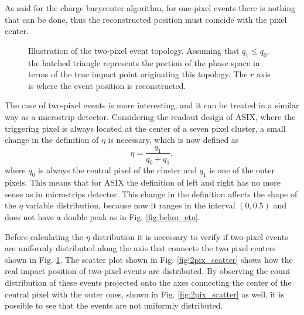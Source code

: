 As said for the charge barycenter algorithm, for one-pixel events there is nothing that can be done, thus the reconstructed position must coincide with the pixel center.

\begin{figure}[!t]
    \centering
    \caption{Illustration of the two-pixel event topology. Assuming that  $q_1 \leq q_0$, 
    the hatched triangle represents the portion of the phase space in terms of the 
    true impact point originating this topology. The $r$ axis is where the event position is reconstructed.}
    \label{fig:two_pixel_event}
\end{figure}

The case of two-pixel events is more interesting, and it can be treated in a similar way as a microstrip detector. Considering the readout design of ASIX, where the triggering pixel is always located at the center of a seven pixel cluster, a small change in the definition of $\eta$ is necessary, which is now defined as
\begin{equation}
\eta = \frac{q_1}{q_0 + q_1},
\label{eq:eta_2pix}
\end{equation}
where $q_0$ is always the central pixel of the cluster and $q_1$ is one of the outer pixels. This means that for ASIX the definition of left and right has no more sense as in microstrips detector. This change in the definition affects the shape of the $\eta$ variable distribution, because now it ranges in the interval $(0, 0.5)$ and does not have a double peak as in Fig. \ref{fig:belau_eta}. 

Before calculating the $\eta$ distribution it is necessary to verify if two-pixel events are uniformly distributed along the axis that connects the two pixel centers shown in Fig. \ref{fig:two_pixel_event}. The scatter plot shown in Fig. \ref{fig:2pix_scatter} shows how the real impact position of two-pixel events are distributed. By observing the count distribution of these events projected onto the axes connecting the center of the central pixel with the outer ones, shown in Fig. \ref{fig:2pix_scatter} as well, it is possible to see that the events are not uniformly distributed.

